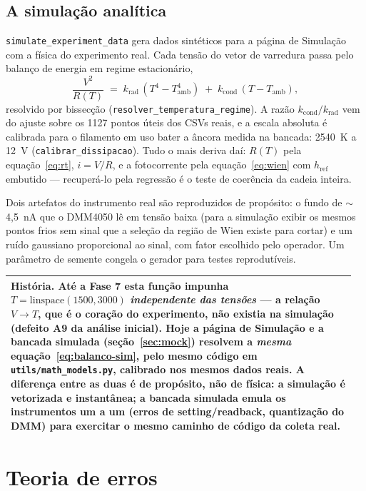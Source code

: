 \documentclass[11pt,a4paper]{article}
\newenvironment{nota}
  {\par\medskip\noindent\begin{tabular}{|p{0.96\linewidth}|}\hline\rule{0pt}{3ex}}
  {\\[1ex]\hline\end{tabular}\par\medskip}
\begin{document}
\subsection{A simulação analítica}

\texttt{simulate\_experiment\_data} gera dados sintéticos para a página de
Simulação com a física do experimento real. Cada tensão do vetor de varredura
passa pelo balanço de energia em regime estacionário,
\begin{equation}
\frac{V^2}{R(T)} \;=\; k_{\mathrm{rad}}\,(T^4 - T_{\mathrm{amb}}^4)
\;+\; k_{\mathrm{cond}}\,(T - T_{\mathrm{amb}}),
\label{eq:balanco-sim}
\end{equation}
resolvido por bissecção (\texttt{resolver\_temperatura\_regime}). A razão
$k_{\mathrm{cond}}/k_{\mathrm{rad}}$ vem do ajuste sobre os 1127 pontos úteis
dos CSVs reais, e a escala absoluta é calibrada para o filamento em uso bater a
âncora medida na bancada: 2540~K a 12~V (\texttt{calibrar\_dissipacao}). Tudo
o mais deriva daí: $R(T)$ pela equação~\eqref{eq:rt}, $i = V/R$, e a
fotocorrente pela equação~\eqref{eq:wien} com $h_{\text{ref}}$ embutido ---
recuperá-lo pela regressão é o teste de coerência da cadeia inteira.

Dois artefatos do instrumento real são reproduzidos de propósito: o fundo de
$\sim$4,5~nA que o DMM4050 lê em tensão baixa (para a simulação exibir os
mesmos pontos frios sem sinal que a seleção da região de Wien existe para
cortar) e um ruído gaussiano proporcional ao sinal, com fator escolhido pelo
operador. Um parâmetro de semente congela o gerador para testes reprodutíveis.

\begin{nota}
\textbf{História.} Até a Fase 7 esta função impunha
$T = \mathrm{linspace}(1500, 3000)$ \emph{independente das tensões} --- a
relação $V \to T$, que é o coração do experimento, não existia na simulação
(defeito A9 da análise inicial). Hoje a página de Simulação e a bancada
simulada (seção~\ref{sec:mock}) resolvem a \emph{mesma}
equação~\eqref{eq:balanco-sim}, pelo mesmo código em
\texttt{utils/math\_models.py}, calibrado nos mesmos dados reais. A diferença
entre as duas é de propósito, não de física: a simulação é vetorizada e
instantânea; a bancada simulada emula os instrumentos um a um (erros de
setting/readback, quantização do DMM) para exercitar o mesmo caminho de código
da coleta real.
\end{nota}

\section{Teoria de erros}
\label{sec:erros}
\end{document}
